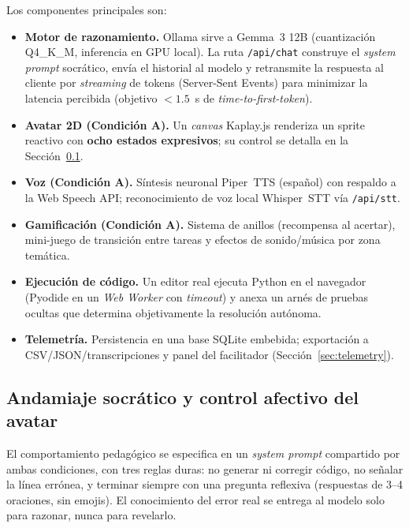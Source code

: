 \documentclass[conference]{IEEEtran}
\begin{document}
Los componentes principales son:
\begin{itemize}
  \item \textbf{Motor de razonamiento.} Ollama sirve a Gemma~3 12B (cuantizaci\'on Q4\_K\_M,
        inferencia en GPU local). La ruta \texttt{/api/chat} construye el \emph{system prompt}
        socr\'atico, env\'ia el historial al modelo y retransmite la respuesta al cliente por
        \emph{streaming} de tokens (Server-Sent Events) para minimizar la latencia percibida
        (objetivo $<1.5$~s de \emph{time-to-first-token}).
  \item \textbf{Avatar 2D (Condici\'on A).} Un \emph{canvas} Kaplay.js renderiza un sprite reactivo
        con \textbf{ocho estados expresivos}; su control se detalla en la
        Secci\'on~\ref{sec:scaffold}.
  \item \textbf{Voz (Condici\'on A).} S\'intesis neuronal Piper~TTS (espa\~nol) con respaldo a la
        Web Speech API; reconocimiento de voz local Whisper~STT v\'ia \texttt{/api/stt}.
  \item \textbf{Gamificaci\'on (Condici\'on A).} Sistema de anillos (recompensa al acertar),
        mini-juego de transici\'on entre tareas y efectos de sonido/m\'usica por zona tem\'atica.
  \item \textbf{Ejecuci\'on de c\'odigo.} Un editor real ejecuta Python en el navegador (Pyodide en
        un \emph{Web Worker} con \emph{timeout}) y anexa un arn\'es de pruebas ocultas que
        determina objetivamente la resoluci\'on aut\'onoma.
  \item \textbf{Telemetr\'ia.} Persistencia en una base SQLite embebida; exportaci\'on a
        CSV/JSON/transcripciones y panel del facilitador (Secci\'on~\ref{sec:telemetry}).
\end{itemize}

\subsection{Andamiaje socr\'atico y control afectivo del avatar}
\label{sec:scaffold}
El comportamiento pedag\'ogico se especifica en un \emph{system prompt} compartido por ambas
condiciones, con tres reglas duras: no generar ni corregir c\'odigo, no se\~nalar la l\'inea
err\'onea, y terminar siempre con una pregunta reflexiva (respuestas de 3--4 oraciones, sin
emojis). El conocimiento del error real se entrega al modelo solo para razonar, nunca para
revelarlo.
\end{document}
